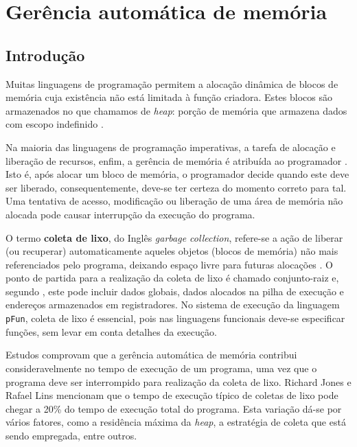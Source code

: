 \documentclass[ccc, pg2]{esinucpel}
\begin{document}



\chapter{Gerência automática de memória} \label{sec:memmanag}

\section{Introdução}
Muitas linguagens de programação permitem a alocação dinâmica de blocos de memória cuja existência não está limitada à função criadora. Estes blocos são armazenados no que chamamos de \textit{heap}: porção de memória que armazena dados com escopo indefinido \cite{bib:herlihy:theart}.

Na maioria das linguagens de programação imperativas, a tarefa de alocação e liberação de recursos, enfim, a gerência de memória é atribuída ao programador \cite{bib:lins:gc}. Isto é, após alocar um bloco de memória, o programador decide quando este deve ser liberado, consequentemente, deve-se ter certeza do momento correto para tal. Uma tentativa de acesso, modificação ou liberação de uma área de memória não alocada pode causar interrupção da execução do programa. 

O termo \textbf{coleta de lixo}, do Inglês \textit{garbage collection}, refere-se a ação de liberar (ou recuperar) automaticamente aqueles objetos (blocos de memória) não mais referenciados pelo programa, deixando espaço livre para futuras alocações \cite{bib:samsom:gengc}. O ponto de partida para a realização da coleta de lixo é chamado conjunto-raiz e, segundo \cite{bib:marcos}, este pode incluir dados globais, dados alocados na pilha de execução e endereços armazenados em registradores. No sistema de execução da linguagem \texttt{pFun}, coleta de lixo é essencial, pois nas linguagens funcionais deve-se especificar funções, sem levar em conta detalhes da execução.

Estudos comprovam que a gerência automática de memória contribui consideravelmente no tempo de execução de um programa, uma vez que o programa deve ser interrompido para realização da coleta de lixo. Richard Jones e Rafael Lins \cite{bib:lins:gc} mencionam que o tempo de execução típico de coletas de lixo pode chegar a 20\% do tempo de execução total do programa. Esta variação dá-se por vários fatores, como a residência máxima da {\it heap}, a estratégia de coleta que está sendo empregada, entre outros.
\end{document}
